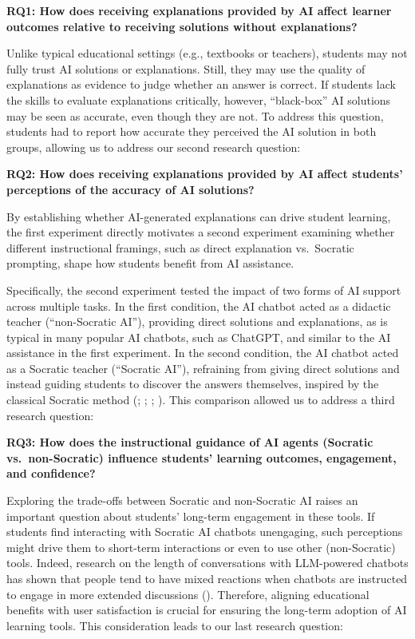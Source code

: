 \documentclass[
  11pt,
]{article}
\begin{document}
\textbf{RQ1: How does receiving explanations provided by AI affect learner outcomes relative to receiving solutions without explanations?}

Unlike typical educational settings (e.g., textbooks or teachers), students may not fully trust AI solutions or explanations. Still, they may use the quality of explanations as evidence to judge whether an answer is correct. If students lack the skills to evaluate explanations critically, however, ``black-box'' AI solutions may be seen as accurate, even though they are not. To address this question, students had to report how accurate they perceived the AI solution in both groups, allowing us to address our second research question:

\textbf{RQ2: How does receiving explanations provided by AI affect students' perceptions of the accuracy of AI solutions?}

By establishing whether AI-generated explanations can drive student learning, the first experiment directly motivates a second experiment examining whether different instructional framings, such as direct explanation vs.~Socratic prompting, shape how students benefit from AI assistance.

Specifically, the second experiment tested the impact of two forms of AI support across multiple tasks. In the first condition, the AI chatbot acted as a didactic teacher (``non-Socratic AI''), providing direct solutions and explanations, as is typical in many popular AI chatbots, such as ChatGPT, and similar to the AI assistance in the first experiment. In the second condition, the AI chatbot acted as a Socratic teacher (``Socratic AI''), refraining from giving direct solutions and instead guiding students to discover the answers themselves, inspired by the classical Socratic method (; ; ; ). This comparison allowed us to address a third research question:

\textbf{RQ3: How does the instructional guidance of AI agents (Socratic vs.~non-Socratic) influence students' learning outcomes, engagement, and confidence?}

Exploring the trade-offs between Socratic and non-Socratic AI raises an important question about students' long-term engagement in these tools. If students find interacting with Socratic AI chatbots unengaging, such perceptions might drive them to short-term interactions or even to use other (non-Socratic) tools. Indeed, research on the length of conversations with LLM-powered chatbots has shown that people tend to have mixed reactions when chatbots are instructed to engage in more extended discussions (). Therefore, aligning educational benefits with user satisfaction is crucial for ensuring the long-term adoption of AI learning tools. This consideration leads to our last research question:
\end{document}
